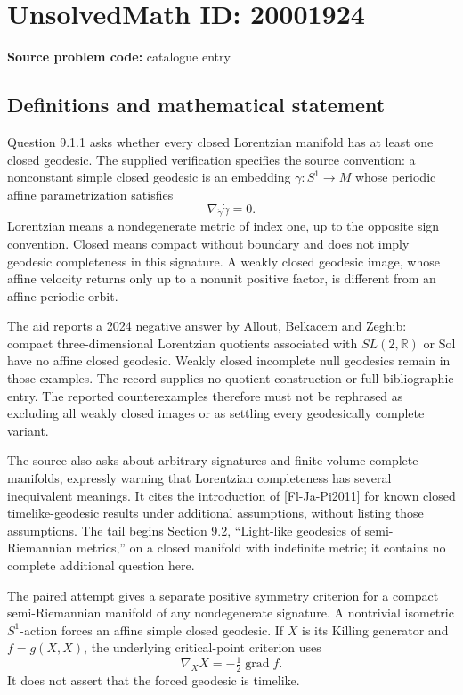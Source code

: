 \documentclass[11pt]{article}
\begin{document}
\section*{UnsolvedMath ID: 20001924}
\textbf{Source problem code:} catalogue entry
\subsection{Definitions and mathematical statement}
Question 9.1.1 asks whether every closed Lorentzian manifold has at least one closed geodesic. The supplied verification specifies the source convention: a nonconstant simple closed geodesic is an embedding \(\gamma:S^1\to M\) whose periodic affine parametrization satisfies
\[
 \nabla_{\dot\gamma}\dot\gamma=0.
\]
Lorentzian means a nondegenerate metric of index one, up to the opposite sign convention. Closed means compact without boundary and does not imply geodesic completeness in this signature. A weakly closed geodesic image, whose affine velocity returns only up to a nonunit positive factor, is different from an affine periodic orbit.

The aid reports a 2024 negative answer by Allout, Belkacem and Zeghib: compact three-dimensional Lorentzian quotients associated with \(SL(2,\mathbb R)\) or \(\mathrm{Sol}\) have no affine closed geodesic. Weakly closed incomplete null geodesics remain in those examples. The record supplies no quotient construction or full bibliographic entry. The reported counterexamples therefore must not be rephrased as excluding all weakly closed images or as settling every geodesically complete variant.

The source also asks about arbitrary signatures and finite-volume complete manifolds, expressly warning that Lorentzian completeness has several inequivalent meanings. It cites the introduction of [Fl-Ja-Pi2011] for known closed timelike-geodesic results under additional assumptions, without listing those assumptions. The tail begins Section 9.2, ``Light-like geodesics of semi-Riemannian metrics,'' on a closed manifold with indefinite metric; it contains no complete additional question here.

The paired attempt gives a separate positive symmetry criterion for a compact semi-Riemannian manifold of any nondegenerate signature. A nontrivial isometric \(S^1\)-action forces an affine simple closed geodesic. If \(X\) is its Killing generator and \(f=g(X,X)\), the underlying critical-point criterion uses
\[
 \nabla_XX=-\tfrac12\operatorname{grad}f.
\]
It does not assert that the forced geodesic is timelike.
\end{document}
